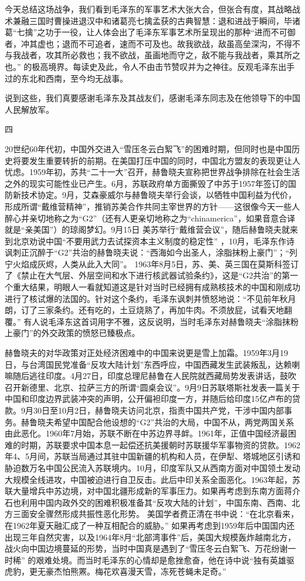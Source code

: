 \documentclass[UTF8, 12pt, a4paper]{ctexrep}
\begin{document}
今天总结这场战争，我们看到毛泽东的军事艺术大张大合，但张合有度，其战略战术兼融三国时曹操进退汉中和诸葛亮七擒孟获的古典智慧：退和进战于瞬间，毕诸葛“七擒”之功于一役，让人体会出了毛泽东军事艺术所呈现出的那种“进而不可御者，冲其虚也；退而不可追者，速而不可及也。故我欲战，敌虽高垒深沟，不得不与我战者，攻其所必救也；我不欲战，虽画地而守之，敌不能与我战者，乘其所之也。” 的极高境界。每读史及此，令人不由击节赞叹并为之神往。反观毛泽东出手过的东北和西南，至今均无战事。

说到这些，我们真要感谢毛泽东及其战友们，感谢毛泽东同志及在他领导下的中国人民解放军。

四

20世纪60年代初，中国外交进入“雪压冬云白絮飞”的困难时期，但同时也是中国历史将要发生重要转折的前期。在美国打压中国的同时，中国北方盟友的表现更让人忧虑。1959年初，苏共“二十一大”召开，赫鲁晓夫宣称把世界战争排除在社会生活之外的现实可能性业已产生。6月，苏联政府单方面撕毁了中苏于1957年签订的国防新技术协定。9月，艾森豪威尔与赫鲁晓夫举行会谈，以牺牲中国利益为代价，形成所谓“戴维营精神”，推销苏美合作共同主宰世界的方针——这很像今天一些人醉心并亲切地称之为“G2”（还有人更亲切地称之为“chinamerica”，如果音意合译就是“亲美国”）的琼阁梦幻。9月15日 美苏举行“戴维营会议”，随后赫鲁晓夫就来到北京劝说中国“不要用武力去试探资本主义制度的稳定性” ，10月，毛泽东作诗讽刺正沉醉于“G2”共治的赫鲁晓夫说：“西海如今出圣人，涂脂抹粉上豪门”；“列宁火焰成灰烬，人类从此入大同”。 1963年8月5日，苏、美、英三国在莫斯科签订了《禁止在大气层、外层空间和水下进行核武器试验条约》，这是“G2共治”的第一个重大结果，明眼人一看就知道这是针对当时已经拥有成熟核技术的中国和刚成功进行了核试爆的法国的。针对这个条约，毛泽东讽刺并愤怒地说：“不见前年秋月朗，订了三家条约。还有吃的，土豆烧熟了，再加牛肉。不须放屁，试看天地翻覆。” 有人说毛泽东这首词用字不雅，这反说明，当时毛泽东对赫鲁晓夫“涂脂抹粉上豪门”的外交政策的愤怒已臻极点。

赫鲁晓夫的对华政策对正处经济困难中的中国来说更是雪上加霜。1959年3月19日，与台湾国民党准备“反攻大陆计划”东西呼应，中国西藏发生武装叛乱，达赖喇嘛随后逃往印度。4月27日，印度总理尼赫鲁在人民院就西藏局势发表讲话，鼓吹召开新德里、北京、拉萨三方的所谓“圆桌会议”。9月9日苏联塔斯社发表一篇关于中国和印度边界武装冲突的声明，公开偏袒印度一方，并随后给印度15亿卢布的贷款。9月30日至10月2日，赫鲁晓夫访问北京，指责中国共产党，干涉中国内部事务。赫鲁晓夫希望中国配合他设想的“G2”共治的大局，中国不从，两党两国关系由此恶化。1960年7月始，苏联不断在中苏边界寻衅。1961年，正值中国经济最困难的时期，苏联要求中国本息一起偿还抗美援朝时苏联援华军事物资的贷款。1962年4、5月间，苏联当局通过其驻中国新疆的机构和人员，在伊犁、塔城地区引诱和胁迫数万名中国公民流入苏联境内。10月，印度军队又从西南方面对中国领土发动大规模全线进攻，中国被迫进行自卫反击。此后中印关系全面恶化。1963年起，苏联大量增兵中苏边境，对中国北疆形成新的军事压力。如果再考虑到东南方面蒋介石也利用中国内政外交的困难积极准备其“反攻大陆的计划”，中国东南、西南、北方三面安全骤然形成共振性恶化形势。 美国学者费正清在书中说：“在北京看来，在1962年夏天融汇成了一种互相配合的威胁。” 如果再考虑到1959年后中国国内还出现三年自然灾害，以及1964年8月“北部湾事件”后，美国大规模轰炸越南北方，战火向中国边境蔓延的形势，当时中国真是遇到了“雪压冬云白絮飞、万花纷谢一时稀” 的艰难处境。而当时毛泽东的心情却是愈挫愈奋，他在诗中说“独有英雄驱虎豹，更无豪杰怕熊罴。梅花欢喜漫天雪，冻死苍蝇未足奇。”
\end{document}
